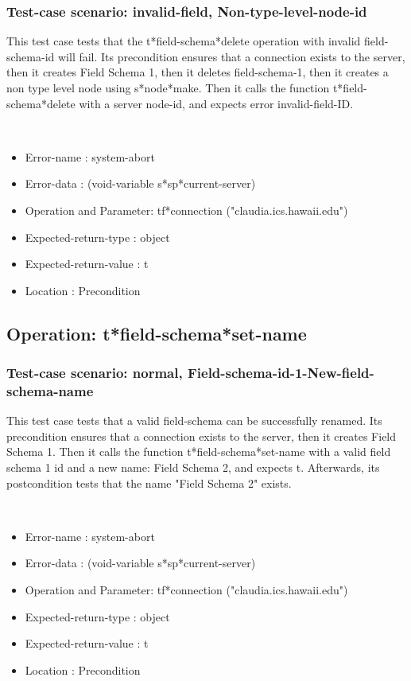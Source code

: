 \subsubsection {Test-case scenario: invalid-field, Non-type-level-node-id}


This test case tests that the t*field-schema*delete operation with invalid field-schema-id will fail.
Its precondition ensures that a connection exists to the server, then it creates Field Schema 1, then it deletes field-schema-1, then it creates a non type level node using s*node*make.
Then it calls the function t*field-schema*delete  with a server node-id, and expects error invalid-field-ID.



\
\begin {itemize}
\item 	Error-name             : system-abort
\item Error-data             : (void-variable s*sp*current-server)
\item Operation and Parameter: tf*connection ("claudia.ics.hawaii.edu")
\item Expected-return-type   : object
\item Expected-return-value  : t
\item Location               : Precondition



\end {itemize}
\subsection {Operation: t*field-schema*set-name}
\subsubsection {Test-case scenario: normal, Field-schema-id-1-New-field-schema-name}


This test case tests that a valid field-schema can be successfully renamed.
Its precondition ensures that a connection exists to the server, then it creates Field Schema 1.
Then it calls the function t*field-schema*set-name  with a valid field schema 1 id and a new name: Field Schema 2, and expects t.
Afterwards, its postcondition tests that the name "Field Schema 2" exists.


\
\begin {itemize}
\item 	Error-name             : system-abort
\item Error-data             : (void-variable s*sp*current-server)
\item Operation and Parameter: tf*connection ("claudia.ics.hawaii.edu")
\item Expected-return-type   : object
\item Expected-return-value  : t
\item Location               : Precondition



\end {itemize}

